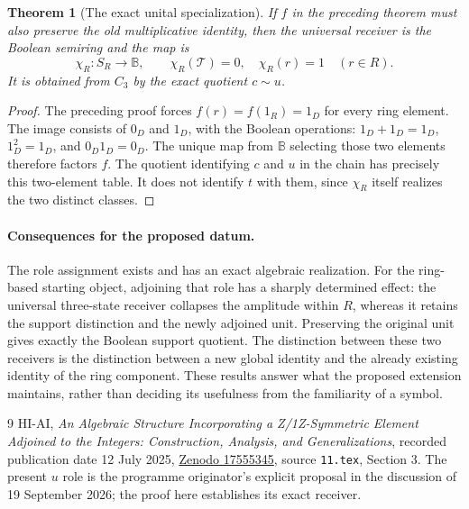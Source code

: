 \documentclass[11pt]{article}
\newtheorem{theorem}{Theorem}
\begin{document}
\begin{theorem}[The exact unital specialization]
If $f$ in the preceding theorem must also preserve the old multiplicative identity, then the universal receiver is the Boolean semiring and the map is
\[
\chi_R:S_R\longrightarrow\mathbb B,\qquad
\chi_R(\mathcal T)=0,\quad \chi_R(r)=1\quad(r\in R).
\]
It is obtained from $C_3$ by the exact quotient $c\sim u$.
\end{theorem}
\begin{proof}
The preceding proof forces $f(r)=f(1_R)=1_D$ for every ring element. The image consists of $0_D$ and $1_D$, with the Boolean operations: $1_D+1_D=1_D$, $1_D^2=1_D$, and $0_D1_D=0_D$. The unique map from $\mathbb B$ selecting those two elements therefore factors $f$. The quotient identifying $c$ and $u$ in the chain has precisely this two-element table. It does not identify $t$ with them, since $\chi_R$ itself realizes the two distinct classes.
\end{proof}

\paragraph{Consequences for the proposed datum.}
The role assignment exists and has an exact algebraic realization. For the ring-based starting object, adjoining that role has a sharply determined effect: the universal three-state receiver collapses the amplitude within $R$, whereas it retains the support distinction and the newly adjoined unit. Preserving the original unit gives exactly the Boolean support quotient. The distinction between these two receivers is the distinction between a new global identity and the already existing identity of the ring component. These results answer what the proposed extension maintains, rather than deciding its usefulness from the familiarity of a symbol.

\begin{thebibliography}{9}
 HI-AI, \emph{An Algebraic Structure Incorporating a Z/1Z-Symmetric Element Adjoined to the Integers: Construction, Analysis, and Generalizations}, recorded publication date 12 July 2025, \href{https://zenodo.org/records/17555345}{Zenodo 17555345}, source \texttt{11.tex}, Section 3. The present $u$ role is the programme originator's explicit proposal in the discussion of 19 September 2026; the proof here establishes its exact receiver.
\end{thebibliography}
\end{document}
